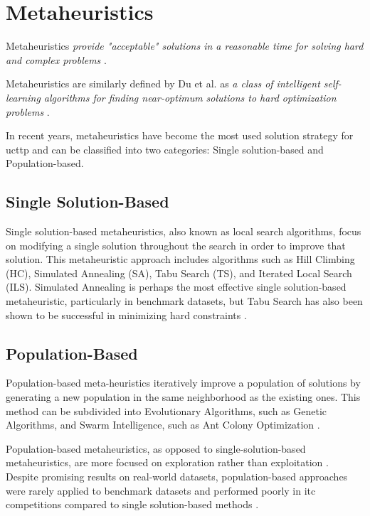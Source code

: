 \section{Metaheuristics}

Metaheuristics \textit{provide "acceptable" solutions in a reasonable time for solving hard and complex problems} \cite{talbi2009metaheuristics}. 

Metaheuristics are similarly defined by Du et al. as \textit{a class of intelligent self-learning algorithms for finding near-optimum solutions to hard optimization problems} \cite{du2016search}.

In recent years, metaheuristics have become the most used solution strategy for \ac{ucttp} and can be classified into two categories: Single solution-based and Population-based.

\subsection{Single Solution-Based}

Single solution-based metaheuristics, also known as local search algorithms, focus on modifying a single solution throughout the search in order to improve that solution. This metaheuristic approach includes algorithms such as Hill Climbing (HC), Simulated Annealing (SA), Tabu Search (TS), and Iterated Local Search (ILS). Simulated Annealing is perhaps the most effective single solution-based metaheuristic, particularly in benchmark datasets, but Tabu Search has also been shown to be successful in minimizing hard constraints \cite{abdipoor_meta-heuristic_2023}.

\subsection{Population-Based}

Population-based meta-heuristics iteratively improve a population of solutions by generating a new population in the same neighborhood as the existing ones. This method can be subdivided into Evolutionary Algorithms, such as Genetic Algorithms, and Swarm Intelligence, such as Ant Colony Optimization \cite{abdipoor_meta-heuristic_2023,du2016search}.

Population-based metaheuristics, as opposed to single-solution-based metaheuristics, are more focused on exploration rather than exploitation \cite{talbi2009metaheuristics,du2016search}. Despite promising results on real-world datasets, population-based approaches were rarely applied to benchmark datasets and performed poorly in \ac{itc} competitions compared to single solution-based methods \cite{abdipoor_meta-heuristic_2023}.

